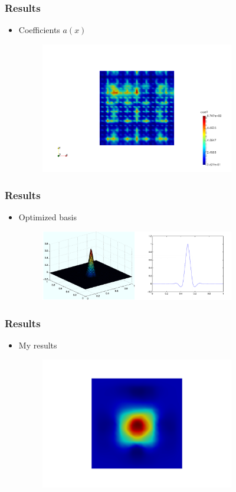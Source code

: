 \documentclass[serif,mathserif, 12pt]{beamer}
\begin{document}
\begin{frame}
  \frametitle{Results}
  \begin{itemize}
  \item Coefficients $a(x)$
    \begin{figure}
      \includegraphics[width=0.8\textwidth]{img/fielda}
    \end{figure}
  \end{itemize}
\end{frame}

\begin{frame}
  \frametitle{Results}
  \begin{itemize}
  \item Optimized basis
    \begin{figure}
      \includegraphics[width=0.8\textwidth]{img/optimized_basis}
    \end{figure}
  \end{itemize}
\end{frame}

\begin{frame}
  \frametitle{Results}
  \begin{itemize}
  \item My results
    \begin{figure}
      \includegraphics[width=0.8\textwidth]{img/my_optimal_basis}
    \end{figure}
  \end{itemize}
\end{frame}
\end{document}
